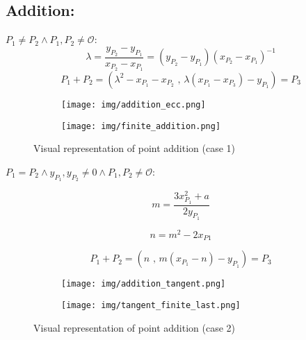 \documentclass[bp,en]{FEIstyle}
\newcommand{\ycor}[1]{
y_{P_{#1}}
}
\begin{document}
\subsection*{Addition:}

 $P_1 \neq P_2 \wedge P_1,P_2 \neq \mathcal{O} $:
\[
\lambda = \frac{y_{P_2} - y_{P_1}}{x_{P_2} - x_{P_1}} = (y_{P_2} - y_{P_1})(x_{P_2} - x_{P_1})^{-1} 
\]
\[
P_1 + P_2 = (\lambda^2 - x_{P_1} - x_{P_2}\text{ , } \lambda(x_{P_1} - x_{P_3}) - y_{P_1}) = P_3
\]
\begin{figure}[H]
    \centering
    \begin{subfigure}{0.38\textwidth}
        \texttt{[image: img/addition\_ecc.png]}
        \label{fig:addition_curve_1}
    \end{subfigure}%
    \begin{subfigure}{0.412\textwidth}
    
        \texttt{[image: img/finite\_addition.png]}
        \label{fig:addition_curve_2}
    \end{subfigure}%
    \caption{Visual representation of point addition (case 1)}
    \label{fig:addition_elliptic_curves_1}
\end{figure}


 $P_1 = P_2 \wedge y_{P_1},\ycor{2} \neq 0\wedge P_1,P_2 \neq \mathcal{O} $: \par
\[
m = \frac{3x_{P_1}^2 + a}{2y_{P_1}}
\]

\[
n = m^2 - 2{x_{P1}}
\]


\[
P_1 + P_2 = (n\text{ , } m(x_{P_1} - n) - y_{P_1}) = P_3
\]

\begin{figure}[H]
    \centering
    \begin{subfigure}{0.38\textwidth}
        \texttt{[image: img/addition\_tangent.png]}
        \label{fig:addition_curve_3}
    \end{subfigure}%
    \begin{subfigure}{0.42\textwidth}
        \texttt{[image: img/tangent\_finite\_last.png]}
        \label{fig:addition_curve_4}
    \end{subfigure}%
    \caption{Visual representation of point addition (case 2)}
    \label{fig:addition_elliptic_curves_2}
\end{figure}
\end{document}
